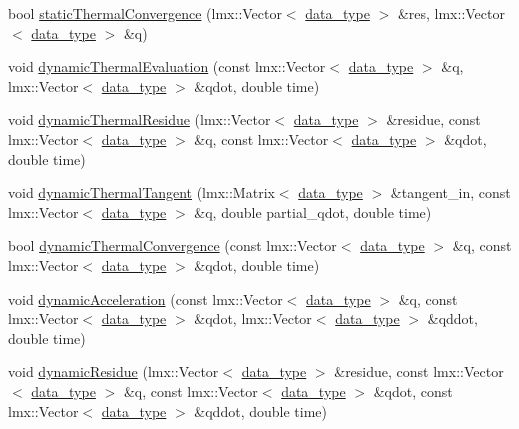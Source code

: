 \begin{DoxyCompactItemize}
bool \hyperlink{classmknix_1_1_simulation_adc5bcdaba46bc9e5332e7e142dd4558f}{static\-Thermal\-Convergence} (lmx\-::\-Vector$<$ \hyperlink{namespacemknix_a16be4b246fbf2cceb141e3a179111020}{data\-\_\-type} $>$ \&res, lmx\-::\-Vector$<$ \hyperlink{namespacemknix_a16be4b246fbf2cceb141e3a179111020}{data\-\_\-type} $>$ \&q)
\item 
void \hyperlink{classmknix_1_1_simulation_a4b2297b6adf5b7c2f0c65bae5ea75f7f}{dynamic\-Thermal\-Evaluation} (const lmx\-::\-Vector$<$ \hyperlink{namespacemknix_a16be4b246fbf2cceb141e3a179111020}{data\-\_\-type} $>$ \&q, lmx\-::\-Vector$<$ \hyperlink{namespacemknix_a16be4b246fbf2cceb141e3a179111020}{data\-\_\-type} $>$ \&qdot, double time)
\item 
void \hyperlink{classmknix_1_1_simulation_abc0f23c897ee438c5cb5c889134ad436}{dynamic\-Thermal\-Residue} (lmx\-::\-Vector$<$ \hyperlink{namespacemknix_a16be4b246fbf2cceb141e3a179111020}{data\-\_\-type} $>$ \&residue, const lmx\-::\-Vector$<$ \hyperlink{namespacemknix_a16be4b246fbf2cceb141e3a179111020}{data\-\_\-type} $>$ \&q, const lmx\-::\-Vector$<$ \hyperlink{namespacemknix_a16be4b246fbf2cceb141e3a179111020}{data\-\_\-type} $>$ \&qdot, double time)
\item 
void \hyperlink{classmknix_1_1_simulation_afcf44a0289808f80bf6789a9671c9c55}{dynamic\-Thermal\-Tangent} (lmx\-::\-Matrix$<$ \hyperlink{namespacemknix_a16be4b246fbf2cceb141e3a179111020}{data\-\_\-type} $>$ \&tangent\-\_\-in, const lmx\-::\-Vector$<$ \hyperlink{namespacemknix_a16be4b246fbf2cceb141e3a179111020}{data\-\_\-type} $>$ \&q, double partial\-\_\-qdot, double time)
\item 
bool \hyperlink{classmknix_1_1_simulation_ac54cb3aace5dd45148abc3a85766a107}{dynamic\-Thermal\-Convergence} (const lmx\-::\-Vector$<$ \hyperlink{namespacemknix_a16be4b246fbf2cceb141e3a179111020}{data\-\_\-type} $>$ \&q, const lmx\-::\-Vector$<$ \hyperlink{namespacemknix_a16be4b246fbf2cceb141e3a179111020}{data\-\_\-type} $>$ \&qdot, double time)
\item 
void \hyperlink{classmknix_1_1_simulation_ace4ce2a959690e14c443b3c6e83c2690}{dynamic\-Acceleration} (const lmx\-::\-Vector$<$ \hyperlink{namespacemknix_a16be4b246fbf2cceb141e3a179111020}{data\-\_\-type} $>$ \&q, const lmx\-::\-Vector$<$ \hyperlink{namespacemknix_a16be4b246fbf2cceb141e3a179111020}{data\-\_\-type} $>$ \&qdot, lmx\-::\-Vector$<$ \hyperlink{namespacemknix_a16be4b246fbf2cceb141e3a179111020}{data\-\_\-type} $>$ \&qddot, double time)
\item 
void \hyperlink{classmknix_1_1_simulation_ae78bef0d5f80665be4a0c2d926e99973}{dynamic\-Residue} (lmx\-::\-Vector$<$ \hyperlink{namespacemknix_a16be4b246fbf2cceb141e3a179111020}{data\-\_\-type} $>$ \&residue, const lmx\-::\-Vector$<$ \hyperlink{namespacemknix_a16be4b246fbf2cceb141e3a179111020}{data\-\_\-type} $>$ \&q, const lmx\-::\-Vector$<$ \hyperlink{namespacemknix_a16be4b246fbf2cceb141e3a179111020}{data\-\_\-type} $>$ \&qdot, const lmx\-::\-Vector$<$ \hyperlink{namespacemknix_a16be4b246fbf2cceb141e3a179111020}{data\-\_\-type} $>$ \&qddot, double time)

\end{DoxyCompactItemize}
